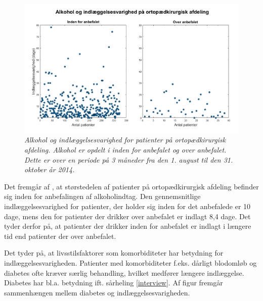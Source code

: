 \begin{figure}[H]
	\centering
	\includegraphics[scale=0.4]{figures/alkohologindlaeg}
	\caption{\textit{Alkohol og indlæggelsesvarighed for patienter på ortopædkirurgisk afdeling. Alkohol er opdelt i inden for anbefalet og over anbefalet. Dette er over en periode på 3 måneder fra den 1. august til den 31. oktober år 2014. }}
	\label{alkohologindlaeggelse}
\end{figure}


\noindent
Det fremgår af , at størstedelen af patienter på ortopædkirurgisk afdeling befinder sig inden for anbefalingen af alkoholindtag. Den gennemsnitlige indlæggelsesvarighed for patienter, der holder sig inden for det anbefalede er 10 dage, mens den for patienter der drikker over anbefalet er indlagt 8,4 dage. Det tyder derfor på, at patienter der drikker inden for anbefalet er indlagt i længere tid end patienter der over anbefalet. 

Det tyder på, at livsstilsfaktorer som komorbiditeter har betydning for indlæggelsesvarigheden. Patienter med komorbiditeter f.eks. dårligt blodomløb og diabetes ofte kræver særlig behandling, hvilket medfører længere indlæggelse. Diabetes har bl.a. betydning ift. sårheling \ref{interview}. Af figur  fremgår sammenhængen mellem diabetes og indlæggelsesvarigheden. 


